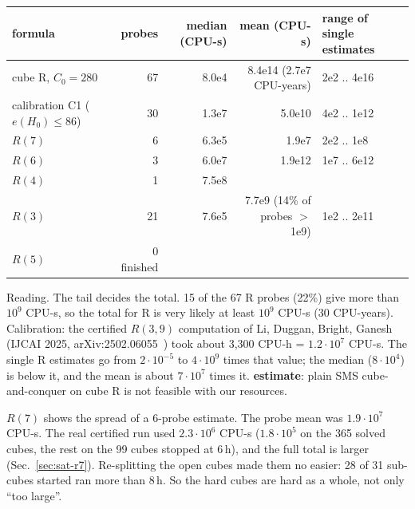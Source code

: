 \begin{center}\footnotesize\setlength{\tabcolsep}{4pt}
\begin{tabular}{@{}lrrrl@{}}
\toprule
formula & probes & median (CPU-s) & mean (CPU-s) & range of single estimates \\
\midrule
cube R, $C_0 = 280$ & 67 & 8.0e4 & 8.4e14 (2.7e7 CPU-years) & 2e2 .. 4e16 \\
calibration C1 ($e(H_0) \le 86$) & 30 & 1.3e7 & 5.0e10 & 4e2 .. 1e12 \\
$R(7)$ & 6 & 6.3e5 & 1.9e7 & 2e2 .. 1e8 \\
$R(6)$ & 3 & 6.0e7 & 1.9e12 & 1e7 .. 6e12 \\
$R(4)$ & 1 & 7.5e8 & & \\
$R(3)$ & 21 & 7.6e5 & 7.7e9 (14\% of probes $>$ 1e9) & 1e2 .. 2e11 \\
$R(5)$ & 0 finished & & & \\
\bottomrule
\end{tabular}
\end{center}

Reading. The tail decides the total. 15 of the 67 R probes (22\%) give more than $10^{9}$ CPU-s, so the total for R is
very likely at least $10^{9}$ CPU-s (30 CPU-years). Calibration: the certified $R(3,9)$ computation of Li, Duggan, Bright,
Ganesh (IJCAI 2025, arXiv:2502.06055~\cite{DuLBG}) took about 3,300 CPU-h = $1.2\cdot 10^{7}$ CPU-s. The single R estimates go from $2\cdot 10^{-5}$ to
$4\cdot 10^{9}$ times that value; the median ($8\cdot 10^{4}$) is below it, and the mean is about $7\cdot 10^{7}$ times it.
\textbf{estimate}: plain SMS cube-and-conquer on cube R is not feasible with our resources.

$R(7)$ shows the spread of a 6-probe estimate. The probe mean was $1.9\cdot 10^{7}$ CPU-s. The real certified run used $2.3\cdot 10^{6}$ CPU-s
($1.8\cdot 10^{5}$ on the 365 solved cubes, the rest on the 99 cubes stopped at 6\,h), and the full total is larger (Sec.~\ref{sec:sat-r7}).
Re-splitting the open cubes made them no easier: 28 of 31 sub-cubes started ran more than 8\,h. So the hard
cubes are hard as a whole, not only ``too large''.

